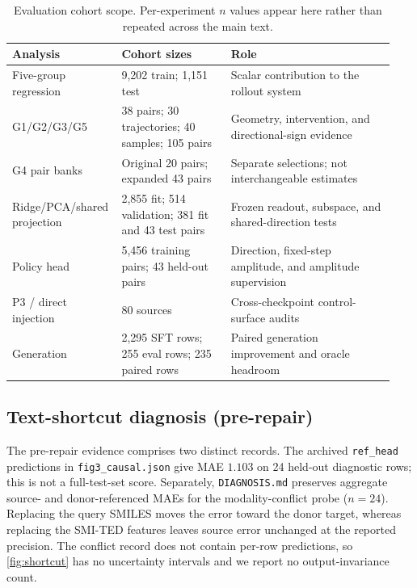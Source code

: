 \documentclass[11pt]{article}
\begin{document}
\begin{table}[h]
\centering
\caption{Evaluation cohort scope. Per-experiment $n$ values appear here rather than repeated across the main text.}
\label{tab:scope}
\small
\begin{tabular}{@{}p{0.24\linewidth}p{0.28\linewidth}p{0.42\linewidth}@{}}
\toprule
Analysis & Cohort sizes & Role \\
\midrule
Five-group regression & 9{,}202 train; 1{,}151 test & Scalar contribution to the rollout system \\
G1/G2/G3/G5 & 38 pairs; 30 trajectories; 40 samples; 105 pairs & Geometry, intervention, and directional-sign evidence \\
G4 pair banks & Original 20 pairs; expanded 43 pairs & Separate selections; not interchangeable estimates \\
Ridge/PCA/shared projection & 2{,}855 fit; 514 validation; 381 fit and 43 test pairs & Frozen readout, subspace, and shared-direction tests \\
Policy head & 5{,}456 training pairs; 43 held-out pairs & Direction, fixed-step amplitude, and amplitude supervision \\
P3 / direct injection & 80 sources & Cross-checkpoint control-surface audits \\
Generation & 2{,}295 SFT rows; 255 eval rows; 235 paired rows & Paired generation improvement and oracle headroom \\
\bottomrule
\end{tabular}
\end{table}

\subsection{Text-shortcut diagnosis (pre-repair)}

The pre-repair evidence comprises two distinct records. The archived \texttt{ref\_head} predictions in \texttt{fig3\_causal.json} give MAE $1.103$ on 24 held-out diagnostic rows; this is not a full-test-set score. Separately, \texttt{DIAGNOSIS.md} preserves aggregate source- and donor-referenced MAEs for the modality-conflict probe ($n=24$). Replacing the query SMILES moves the error toward the donor target, whereas replacing the SMI-TED features leaves source error unchanged at the reported precision. The conflict record does not contain per-row predictions, so \cref{fig:shortcut} has no uncertainty intervals and we report no output-invariance count.


\end{document}
